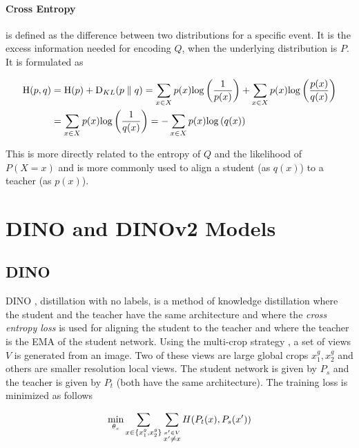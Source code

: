 \paragraph{Cross Entropy} is defined as the difference between two
distributions for a specific event. It is the excess information
needed for encoding $Q$, when the underlying distribution is $P$.
It is formulated as

\begin{align}
    \textup{H}(p, q) &= \textup{H}(p) + \textup{D}_{KL}(p \parallel q)
        = \sum_{x \in X} p(x) \mathrm{log}\left(\frac{1}{p(x)}\right)
            + \sum_{x \in X} p(x) \mathrm{log}\left(\frac{p(x)}{q(x)}
                \right) \nonumber \\
        &= \sum_{x \in X} p(x) \mathrm{log}\left(\frac{1}{q(x)}\right)
        = -\sum_{x \in X} p(x) \mathrm{log}\left(q(x)\right)
\end{align}

This is more directly related to the entropy of $Q$ and the likelihood
of $P(X=x)$ and is more commonly used to align a student (as $q(x)$)
to a teacher (as $p(x)$).

\section{DINO and DINOv2 Models}

\subsection{DINO}
\label{subsec:fm-dino}

DINO \cite{Caron2021EmergingPI}, distillation with no labels, is a
method of knowledge distillation where the student and the teacher
have the same architecture and where the \emph{cross entropy loss} is
used for aligning the student to the teacher and where the teacher is
the EMA of the student network. Using the multi-crop strategy
\cite{Caron2020UnsupervisedLO}, a set of views $V$ is generated from
an image. Two of these views are large global crops ${x_1^g, x_2^g}$
and others are smaller resolution local views. The student network is
given by $P_s$ and the teacher is given by $P_t$ (both have the same
architecture). The training loss is minimized as follows

\begin{equation}
    \underset{\theta_s}{\textup{min}} \sum_{x \in \{x_1^g, x_2^g\}}
        \sum_{\overset{x' \in V}{x' \neq x}} H(P_t(x), P_s(x'))
\end{equation}

